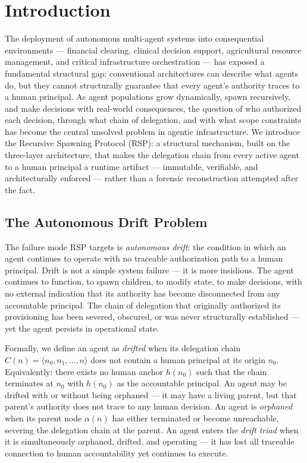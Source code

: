 \section{Introduction}

The deployment of autonomous multi-agent systems into consequential environments --- financial clearing, clinical decision support, agricultural resource management, and critical infrastructure orchestration --- has exposed a fundamental structural gap: conventional architectures can describe what agents do, but they cannot structurally guarantee that every agent's authority traces to a human principal. As agent populations grow dynamically, spawn recursively, and make decisions with real-world consequences, the question of who authorized each decision, through what chain of delegation, and with what scope constraints has become the central unsolved problem in agentic infrastructure. We introduce the Recursive Spawning Protocol (RSP): a structural mechanism, built on the \bxthree three-layer architecture, that makes the delegation chain from every active agent to a human principal a runtime artifact --- immutable, verifiable, and architecturally enforced --- rather than a forensic reconstruction attempted after the fact.

\subsection{The Autonomous Drift Problem}

The failure mode RSP targets is \emph{autonomous drift}: the condition in which an agent continues to operate with no traceable authorization path to a human principal. Drift is not a simple system failure --- it is more insidious. The agent continues to function, to spawn children, to modify state, to make decisions, with no external indication that its authority has become disconnected from any accountable principal. The chain of delegation that originally authorized its provisioning has been severed, obscured, or was never structurally established --- yet the agent persists in operational state.

Formally, we define an agent as \emph{drifted} when its delegation chain $C(n) = \langle n_0, n_1, \ldots, n \rangle$ does not contain a human principal at its origin $n_0$. Equivalently: there exists no human anchor $h(n_0)$ such that the chain terminates at $n_0$ with $h(n_0)$ as the accountable principal. An agent may be drifted with or without being orphaned --- it may have a living parent, but that parent's authority does not trace to any human decision. An agent is \emph{orphaned} when its parent node $\alpha(n)$ has either terminated or become unreachable, severing the delegation chain at the parent. An agent enters the \emph{drift triad} when it is simultaneously orphaned, drifted, and operating --- it has lost all traceable connection to human accountability yet continues to execute.


